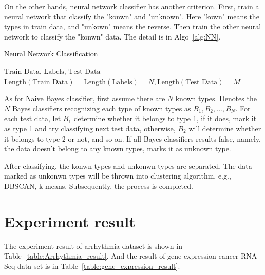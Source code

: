 \documentclass[twocolumn,10pt]{article}
\begin{document}
  On the other hands, neural network classifier has another criterion. First, train a neural network that classify the 
  "konwn" and "unknown". Here "kown" means the types in train data, and "unkown" means the reverse. Then train the other 
  neural network to classify the "konwn" data. The detail is in Algo~\ref{alg:NN}.
  \begin{algorithm}[tb]
    \caption{Neural Network Classification}\label{alg:NN}
    \begin{algorithmic}[1]
      \Require $\text{Train Data, Labels, Test Data}$
      \Assume $\text{Length}(\text{Train Data})=\text{Length}(\text{Labels})=N,\text{Length}(\text{Test Data})=M$
    \end{algorithmic}
  \end{algorithm}

  As for Naive Bayes classifier, first assume there are $N$ known types. Denotes the $N$ Bayes classifiers recognizing each 
  type of known types as $B_1, B_2, ..., B_N$. For each test data, let $B_1$ determine whether it belongs to type 1, if 
  it does, mark it as type 1 and try classifying next test data, otherwise, $B_2$ will determine whether it belongs to type 2 
  or not, and so on. If all Bayes classifiers results false, namely, the data doesn't belong to any known types, marks it 
  as unknown type.
  
  After classifying, the konwn types and unkonwn types are separated. The data marked as unkonwn types will be thrown 
  into clustering algorithm, e.g., DBSCAN, k-means. Subsequently, the process is completed.

\section{Experiment result}
  The experiment result of arrhythmia dataset is shown in Table~\ref{table:Arrhythmia_result}. And the result of gene 
  expression cancer RNA-Seq data set is in Table~\ref{table:gene_expression_result}. 
\end{document}
